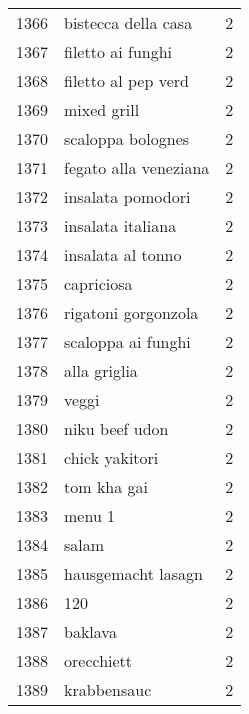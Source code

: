 \begin{tabular}{llr}
1366 &                                bistecca della casa &      2 \\
1367 &                                  filetto ai funghi &      2 \\
1368 &                                filetto al pep verd &      2 \\
1369 &                                        mixed grill &      2 \\
1370 &                                  scaloppa bolognes &      2 \\
1371 &                              fegato alla veneziana &      2 \\
1372 &                                  insalata pomodori &      2 \\
1373 &                                  insalata italiana &      2 \\
1374 &                                  insalata al tonno &      2 \\
1375 &                                         capriciosa &      2 \\
1376 &                                rigatoni gorgonzola &      2 \\
1377 &                                 scaloppa ai funghi &      2 \\
1378 &                                       alla griglia &      2 \\
1379 &                                              veggi &      2 \\
1380 &                                     niku beef udon &      2 \\
1381 &                                     chick yakitori &      2 \\
1382 &                                        tom kha gai &      2 \\
1383 &                                             menu 1 &      2 \\
1384 &                                              salam &      2 \\
1385 &                                 hausgemacht lasagn &      2 \\
1386 &                                                120 &      2 \\
1387 &                                            baklava &      2 \\
1388 &                                         orecchiett &      2 \\
1389 &                                        krabbensauc &      2 \\

\end{tabular}
